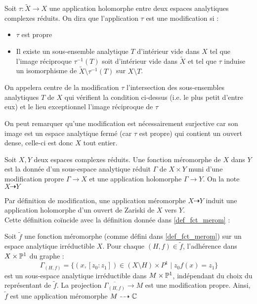 \documentclass[a4page,10pt]{article}
\begin{document}
\begin{Def}
  Soit $\tau : \widetilde{X} \to X$ une application holomorphe entre deux espaces analytiques complexes r\'eduits. On dira que l'application $\tau$ est une modification si :
  \begin{itemize}
  \item $\tau$ est propre
    \item Il existe un sous-ensemble analytique $T$ d'int\'erieur vide dans $X$ tel que l'image r\'eciproque $\tau^{-1}(T)$ soit d'int\'erieur vide dans $\widetilde{X}$ et tel que $\tau$ induise un isomorphisme de $\widetilde{X}\setminus \tau^{-1}(T)$ sur $X \setminus T$.
    \end{itemize}
On appelera centre de la modification $\tau$ l'intersection des sous-ensembles analytiques $T$ de $X$ qui v\'erifient la condition ci-dessus (i.e. le plus petit d'entre eux) et le lieu exceptionnel l'image r\'eciproque de $\tau$
\end{Def}

On peut remarquer qu'une modification est n\'ecessairement surjective car son image est un espace analytique ferm\'e (car $\tau$ est propre) qui contient un ouvert dense, celle-ci est donc $X$ tout entier.

\begin{Def}
Soit $X,Y$ deux espaces complexes r\'eduits. Une fonction m\'eromorphe de $X$ dans $Y$ est la donn\'ee d'un sous-espace analytique r\'eduit $\Gamma$ de $X \times Y$ muni d'une modification propre $\Gamma \to X$ et une application holomorphe $\Gamma \to Y$. On la note $X \dashrightarrow Y$
\end{Def}
Par d\'efinition de modification, une application m\'eromorphe $ X \dashrightarrow Y$ induit une application holomorphe d'un ouvert de Zariski de $X$ vers $Y$. \\
Cette d\'efinition co\"incide avec la d\'efinition donn\'ee dans \ref{def_fct_merom} : 
\begin{Lemme}
Soit $\widetilde{f}$ une fonction m\'eromorphe (comme d\'efini dans \ref{def_fct_merom}) sur un espace analytique irr\'eductible $X$. Pour chaque $(H,f) \in \widetilde{f}$, l'adh\'erence dans $X \times \P^1$ du graphe :
	\[\Gamma_{(H,f)}=\{(x,[z_0 : z_1]) \in (X \setminus H) \times P^1 \mid z_0f(x)=z_1\}
	\]
	est un sous-espace analytique irr\'eductible dans $M \times \P^1$, ind\'ependant du choix du repr\'esentant de $\widetilde{f}$. La projection $\overline{\Gamma_{(H,f)}} \to M$ est une modification propre. Ainsi, $\widetilde{f}$ est une application m\'eromorphe $M \dashrightarrow \C$

\end{Lemme}
\end{document}
